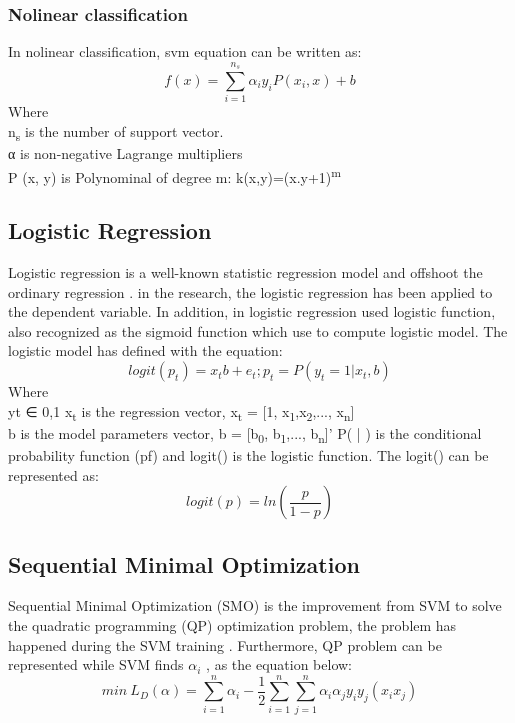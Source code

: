 \documentclass[review]{elsarticle}
\begin{document}
 		\subsubsection{Nolinear classification}
 		In nolinear classification, svm equation can be written as: 
 		\begin{equation}
 		f(x) = \sum_{i=1}^{n_s} \alpha_i y_i P(x_i,x) +b
 		\end{equation}
 		Where \\
 		n\textsubscript{s} is the number of support vector. \\
 		α  is non-negative Lagrange multipliers\\
 		P (x, y) is Polynominal of degree m: k(x,y)=(x.y+1)\textsuperscript{m}
 \subsection{Logistic Regression}
 	Logistic regression is a well-known statistic regression model and offshoot the ordinary regression \cite{Wilson2015}. in the research, the logistic regression has been applied to the dependent variable. In addition, in logistic regression used logistic function, also recognized as the sigmoid function which use to compute logistic model. The logistic model has defined with the equation: 
 	\begin{equation}
 	logit(p_t) =x_tb+e_t; p_t=P(y_t =1|x_t,b)
 	\end{equation}
 	Where \\
 	yt ∈ {0,1} 
 	x\textsubscript{t} is the regression vector, x\textsubscript{t} = [1, x\textsubscript{1},x\textsubscript{2},..., x\textsubscript{n}]\\
 	b is the model parameters vector, b = [b\textsubscript{0}, b\textsubscript{1},..., b\textsubscript{n}]’
 	P( | )  is the conditional probability function (pf) and 
 	logit() is the logistic function. The logit() can be represented as: 
 	\begin{equation}
 	logit(p)=ln(\dfrac{p}{1-p})
 	\end{equation}
 \subsection{Sequential Minimal Optimization}
 	Sequential Minimal Optimization (SMO) is the improvement from SVM to solve the quadratic programming (QP) optimization problem, the problem has happened during the SVM training \cite{Platt1998}. Furthermore, QP problem can be represented while SVM finds $\alpha_i$ , as the equation below: 
 	\begin{equation}
 	min \ L_D(\alpha)= \sum_{i=1}^n \alpha_i -\dfrac{1}{2}\sum_{i=1}^n \sum_{j=1}^n \alpha_i \alpha_j y_iy_j(x_ix_j)
 	\end{equation}
 	
\end{document}
